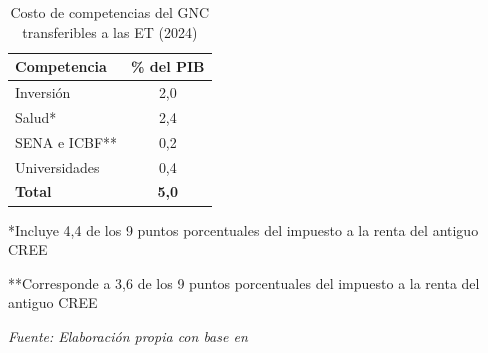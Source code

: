 \begin{table}[h!]
\centering
\caption{Costo de competencias del GNC transferibles a las ET (2024)}
\label{tab:costocomp}
\begin{tabular}{|l|c|}
\hline
\textbf{Competencia}            & \textbf{\% del PIB} \\
\hline
Inversión                   & 2,0 \\
Salud*                       & 2,4 \\
SENA e ICBF**                 & 0,2 \\
Universidades               & 0,4 \\
\hline
\textbf{Total}              & \textbf{5,0} \\
\hline
\end{tabular}
\vspace{0.1cm}
\par \footnotesize{*Incluye 4,4 de los 9 puntos porcentuales del impuesto a la renta del antiguo CREE}
\par \footnotesize{**Corresponde a 3,6 de los 9 puntos porcentuales del impuesto a la renta del antiguo CREE}
\par \footnotesize{\textit{Fuente: Elaboración propia con base en \cite{minhacienda_balance_2025}}}
\end{table}
